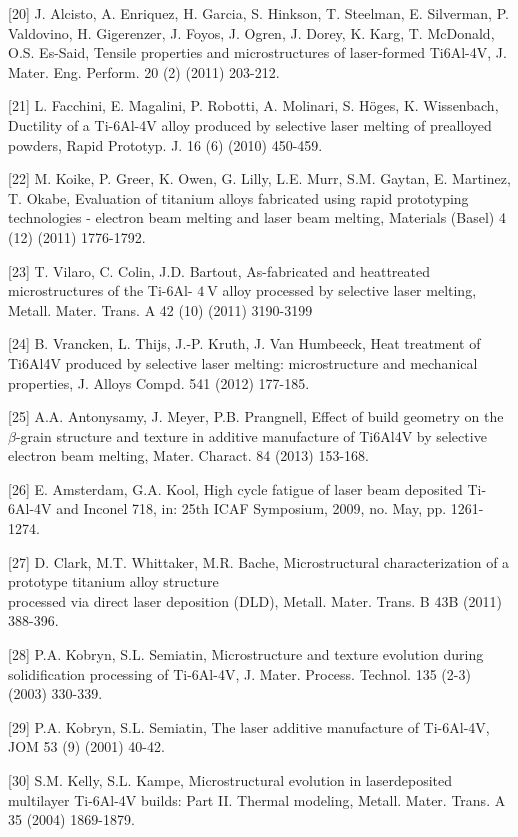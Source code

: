 \documentclass[10pt]{article}
\begin{document}
[20] J. Alcisto, A. Enriquez, H. Garcia, S. Hinkson, T. Steelman, E. Silverman, P. Valdovino, H. Gigerenzer, J. Foyos, J. Ogren, J. Dorey, K. Karg, T. McDonald, O.S. Es-Said, Tensile properties and microstructures of laser-formed Ti6Al-4V, J. Mater. Eng. Perform. 20 (2) (2011) 203-212.

[21] L. Facchini, E. Magalini, P. Robotti, A. Molinari, S. Höges, K. Wissenbach, Ductility of a Ti-6Al-4V alloy produced by selective laser melting of prealloyed powders, Rapid Prototyp. J. 16 (6) (2010) 450-459.

[22] M. Koike, P. Greer, K. Owen, G. Lilly, L.E. Murr, S.M. Gaytan, E. Martinez, T. Okabe, Evaluation of titanium alloys fabricated using rapid prototyping technologies - electron beam melting and laser beam melting, Materials (Basel) 4 (12) (2011) 1776-1792.

[23] T. Vilaro, C. Colin, J.D. Bartout, As-fabricated and heattreated microstructures of the Ti-6Al- $4 \mathrm{~V}$ alloy processed by selective laser melting, Metall. Mater. Trans. A 42 (10) (2011) 3190-3199

[24] B. Vrancken, L. Thijs, J.-P. Kruth, J. Van Humbeeck, Heat treatment of Ti6Al4V produced by selective laser melting: microstructure and mechanical properties, J. Alloys Compd. 541 (2012) 177-185.

[25] A.A. Antonysamy, J. Meyer, P.B. Prangnell, Effect of build geometry on the $\beta$-grain structure and texture in additive manufacture of Ti6Al4V by selective electron beam melting, Mater. Charact. 84 (2013) 153-168.

[26] E. Amsterdam, G.A. Kool, High cycle fatigue of laser beam deposited Ti-6Al-4V and Inconel 718, in: 25th ICAF Symposium, 2009, no. May, pp. 1261-1274.

[27] D. Clark, M.T. Whittaker, M.R. Bache, Microstructural characterization of a prototype titanium alloy structure\\
processed via direct laser deposition (DLD), Metall. Mater. Trans. B 43B (2011) 388-396.

[28] P.A. Kobryn, S.L. Semiatin, Microstructure and texture evolution during solidification processing of Ti-6Al-4V, J. Mater. Process. Technol. 135 (2-3) (2003) 330-339.

[29] P.A. Kobryn, S.L. Semiatin, The laser additive manufacture of Ti-6Al-4V, JOM 53 (9) (2001) 40-42.

[30] S.M. Kelly, S.L. Kampe, Microstructural evolution in laserdeposited multilayer Ti-6Al-4V builds: Part II. Thermal modeling, Metall. Mater. Trans. A 35 (2004) 1869-1879.
\end{document}
